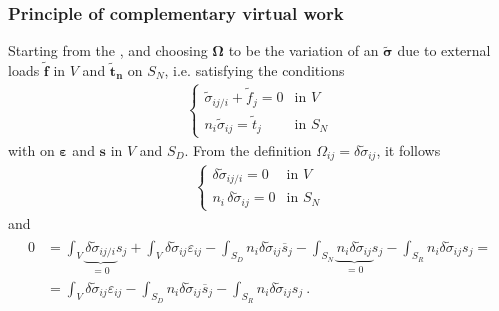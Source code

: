 \documentclass[letterpaper,10pt,english]{jupyterBook}
\begin{document}
\subsubsection{Principle of complementary virtual work}
\label{\detokenize{ch/solids/small-displacements-statics-weak-form-3d:principle-of-complementary-virtual-work}}\label{\detokenize{ch/solids/small-displacements-statics-weak-form-3d:solid-mechanics-intro-small-displacements-statics-weak-form-weak-pcvw}}
\sphinxAtStartPar
Starting from the {\hyperref[\detokenize{ch/solids/small-displacements-statics-weak-form-3d:solid-mechanics-intro-small-displacements-statics-weak-form-weak-congruence}]{}}, and choosing \(\boldsymbol\Omega\) to be the variation of an  \(\widetilde{\boldsymbol{\sigma}}\) due to  external loads \(\widetilde{\mathbf{f}}\) in \(V\) and \(\widetilde{\mathbf{t}}_{\mathbf{n}}\) on \(S_N\), i.e. satisfying the conditions
\begin{equation*}
\begin{split}\begin{cases}
  \widetilde{\sigma}_{ij/i} + \widetilde{f}_j = 0 & \text{in $V$} \\
  n_i \widetilde{\sigma}_{ij} = \widetilde{t}_j   & \text{in $S_N$}
\end{cases}\end{split}
\end{equation*}
\sphinxAtStartPar
with  on \(\boldsymbol\varepsilon\) and \(\mathbf{s}\) in \(V\) and \(S_D\). From the definition \(\Omega_{ij} = \delta \widetilde{\sigma}_{ij}\), it follows
\begin{equation*}
\begin{split}\begin{cases}
  \delta \widetilde{\sigma}_{ij/i}      = 0   & \text{in $V$} \\
  n_i \, \delta \widetilde{\sigma}_{ij} = 0   & \text{in $S_N$}
\end{cases}\end{split}
\end{equation*}
\sphinxAtStartPar
and
\begin{equation*}
\begin{split}\begin{aligned}
0 & = \int_V \underbrace{\delta \widetilde{\sigma}_{ij/i}}_{= 0} s_j  + \int_{V} \delta \widetilde{\sigma}_{ij} \varepsilon_{ij} - \int_{S_D} n_i \delta \widetilde{\sigma}_{ij} \overline{s}_j  - \int_{S_N} \underbrace{n_i \delta \widetilde{\sigma}_{ij}}_{=0} s_j  - \int_{S_R} n_i \delta \widetilde{\sigma}_{ij} s_j = \\
  & = \int_{V} \delta \widetilde{\sigma}_{ij} \varepsilon_{ij} - \int_{S_D} n_i \delta \widetilde{\sigma}_{ij} \overline{s}_j - \int_{S_R} n_i \delta \widetilde{\sigma}_{ij} s_j \ . 
\end{aligned}\end{split}
\end{equation*}
\end{document}
